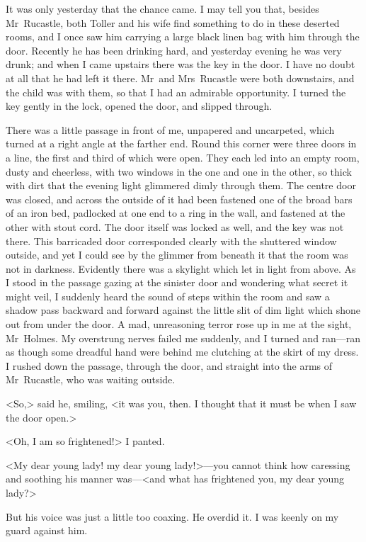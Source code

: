 It was only yesterday that the chance came. I may tell you that, besides Mr~Rucastle, both Toller and his wife find something to do in these deserted rooms, and I once saw him carrying a large black linen bag with him through the door. Recently he has been drinking hard, and yesterday evening he was very drunk; and when I came upstairs there was the key in the door. I have no doubt at all that he had left it there. Mr~and Mrs~Rucastle were both downstairs, and the child was with them, so that I had an admirable opportunity. I turned the key gently in the lock, opened the door, and slipped through.

There was a little passage in front of me, unpapered and uncarpeted, which turned at a right angle at the farther end. Round this corner were three doors in a line, the first and third of which were open. They each led into an empty room, dusty and cheerless, with two windows in the one and one in the other, so thick with dirt that the evening light glimmered dimly through them. The centre door was closed, and across the outside of it had been fastened one of the broad bars of an iron bed, padlocked at one end to a ring in the wall, and fastened at the other with stout cord. The door itself was locked as well, and the key was not there. This barricaded door corresponded clearly with the shuttered window outside, and yet I could see by the glimmer from beneath it that the room was not in darkness. Evidently there was a skylight which let in light from above. As I stood in the passage gazing at the sinister door and wondering what secret it might veil, I suddenly heard the sound of steps within the room and saw a shadow pass backward and forward against the little slit of dim light which shone out from under the door. A mad, unreasoning terror rose up in me at the sight, Mr~Holmes. My overstrung nerves failed me suddenly, and I turned and ran—ran as though some dreadful hand were behind me clutching at the skirt of my dress. I rushed down the passage, through the door, and straight into the arms of Mr~Rucastle, who was waiting outside.

<So,> said he, smiling, <it was you, then. I thought that it must be when I saw the door open.>

<Oh, I am so frightened!> I panted.

<My dear young lady! my dear young lady!>—you cannot think how caressing and soothing his manner was—<and what has frightened you, my dear young lady?>

But his voice was just a little too coaxing. He overdid it. I was keenly on my guard against him.

